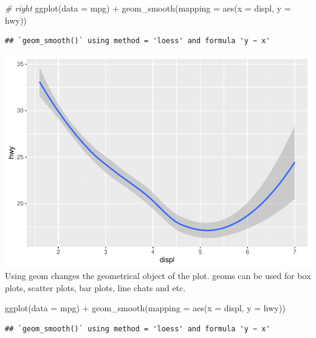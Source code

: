 \documentclass[
]{article}
\newenvironment{Shaded}{\begin{snugshade}}{\end{snugshade}}
\newcommand{\AttributeTok}[1]{\textcolor[rgb]{0.77,0.63,0.00}{#1}}
\newcommand{\CommentTok}[1]{\textcolor[rgb]{0.56,0.35,0.01}{\textit{#1}}}
\newcommand{\FunctionTok}[1]{\textcolor[rgb]{0.00,0.00,0.00}{#1}}
\newcommand{\NormalTok}[1]{#1}
\newcommand{\SpecialCharTok}[1]{\textcolor[rgb]{0.00,0.00,0.00}{#1}}
\begin{document}
\begin{Shaded}
\begin{Highlighting}[]
\CommentTok{\# right}
\FunctionTok{ggplot}\NormalTok{(}\AttributeTok{data =}\NormalTok{ mpg) }\SpecialCharTok{+} 
  \FunctionTok{geom\_smooth}\NormalTok{(}\AttributeTok{mapping =} \FunctionTok{aes}\NormalTok{(}\AttributeTok{x =}\NormalTok{ displ, }\AttributeTok{y =}\NormalTok{ hwy))}
\end{Highlighting}
\end{Shaded}

\begin{verbatim}
## `geom_smooth()` using method = 'loess' and formula 'y ~ x'
\end{verbatim}

\includegraphics{Assignments_files/figure-latex/unnamed-chunk-42-2.pdf}
Using geom changes the geometrical object of the plot. geoms can be used
for box plots, scatter plots, bar plots, line chats and etc.

\begin{Shaded}
\begin{Highlighting}[]
\FunctionTok{ggplot}\NormalTok{(}\AttributeTok{data =}\NormalTok{ mpg) }\SpecialCharTok{+}
  \FunctionTok{geom\_smooth}\NormalTok{(}\AttributeTok{mapping =} \FunctionTok{aes}\NormalTok{(}\AttributeTok{x =}\NormalTok{ displ, }\AttributeTok{y =}\NormalTok{ hwy))}
\end{Highlighting}
\end{Shaded}

\begin{verbatim}
## `geom_smooth()` using method = 'loess' and formula 'y ~ x'
\end{verbatim}
\end{document}
